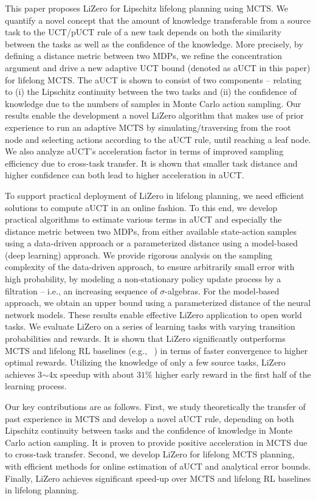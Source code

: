 This paper proposes LiZero for Lipschitz lifelong planning using MCTS. We quantify a novel concept that the amount of knowledge transferable from a source task to the UCT/pUCT rule of a new task depends on both the similarity between the tasks as well as the confidence of the knowledge. More precisely, by defining a distance metric between two MDPs, we refine the concentration argument and drive a new adaptive UCT bound (denoted as aUCT in this paper) for lifelong MCTS. The aUCT is shown to consist of two components -- relating to (i) the Lipschitz continuity between the two tasks and (ii) the confidence of knowledge due to the numbers of samples in Monte Carlo action sampling. Our results enable the development a novel LiZero algorithm that makes use of prior experience to run an adaptive MCTS by simulating/traversing from the root node and selecting actions according to the aUCT rule, until reaching a leaf node. We also analyze aUCT's acceleration factor in terms of improved sampling efficiency due to cross-task transfer. It is shown that smaller task distance and higher confidence can both lead to higher acceleration in aUCT.

To support practical deployment of LiZero in lifelong planning, we need efficient solutions to compute aUCT in an online fashion. To this end, we develop practical algorithms to estimate various terms in aUCT and especially the distance metric between two MDPs, from either available state-action samples using a data-driven approach or a parameterized distance using a model-based (deep learning) approach. We provide rigorous analysis on the sampling complexity of the data-driven approach, to ensure arbitrarily small error with high probability, by modeling a non-stationary policy update process by a filtration -- i.e., an increasing sequence of $\sigma$-algebras. For the model-based approach, we obtain an upper bound using a parameterized distance of the neural network models. These results enable effective LiZero application to open world tasks. %
We evaluate LiZero on a series of learning tasks with varying transition probabilities and rewards. It is shown that LiZero significantly outperforms MCTS and lifelong RL baselines (e.g., ~\cite{winands2024monte,kocsis2006bandit,chengspeculative,Schrittwieser_2020,brafman2002r,lecarpentier2021lipschitz}) in terms of 
faster convergence to higher optimal rewards. Utilizing the knowledge of only a few source tasks, LiZero achieves 3$\sim$4x speedup with about $31\%$ higher early reward in the first half of the learning process.


Our key contributions are as follows. First, we study theoretically the transfer of past experience in MCTS and develop a novel aUCT rule, depending on both Lipschitz continuity between tasks and the confidence of knowledge in Monte Carlo action sampling. It is proven to provide positive acceleration in MCTS due to cross-task transfer. Second, we develop LiZero for lifelong MCTS planning, with efficient methods for online estimation of aUCT and analytical error bounds. Finally, LiZero achieves significant speed-up over MCTS and lifelong RL baselines in lifelong planning.